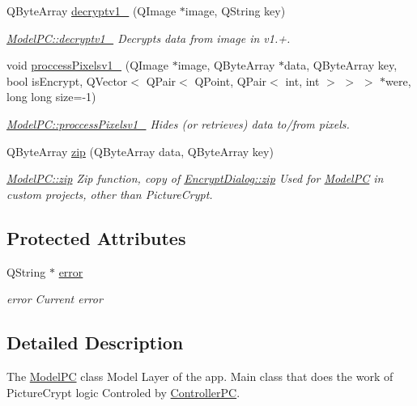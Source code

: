\begin{DoxyCompactItemize}
Q\+Byte\+Array \hyperlink{class_model_p_c_a7a1f7d491e1bde16936190b9e90896b0}{decryptv1\+\_} (Q\+Image $\ast$image, Q\+String key)
\begin{DoxyCompactList}\small\item\em \hyperlink{class_model_p_c_a7a1f7d491e1bde16936190b9e90896b0}{Model\+P\+C\+::decryptv1\+\_} Decrypts data from image in v1.+. \end{DoxyCompactList}\item 
void \hyperlink{class_model_p_c_a5cdb4d1d61ff62ee9d45b496a7dbf1fb}{proccess\+Pixelsv1\+\_} (Q\+Image $\ast$image, Q\+Byte\+Array $\ast$data, Q\+Byte\+Array key, bool is\+Encrypt, Q\+Vector$<$ Q\+Pair$<$ Q\+Point, Q\+Pair$<$ int, int $>$ $>$ $>$ $\ast$were, long long size=-\/1)
\begin{DoxyCompactList}\small\item\em \hyperlink{class_model_p_c_a5cdb4d1d61ff62ee9d45b496a7dbf1fb}{Model\+P\+C\+::proccess\+Pixelsv1\+\_} Hides (or retrieves) data to/from pixels. \end{DoxyCompactList}\item 
Q\+Byte\+Array \hyperlink{class_model_p_c_afebbbfa4b07deba4f68fc6dfb50f353f}{zip} (Q\+Byte\+Array data, Q\+Byte\+Array key)
\begin{DoxyCompactList}\small\item\em \hyperlink{class_model_p_c_afebbbfa4b07deba4f68fc6dfb50f353f}{Model\+P\+C\+::zip} Zip function, copy of \hyperlink{class_encrypt_dialog_a2bff820a3df4ddc36ecb07ed74b7138a}{Encrypt\+Dialog\+::zip} Used for \hyperlink{class_model_p_c}{Model\+PC} in custom projects, other than Picture\+Crypt. \end{DoxyCompactList}\end{DoxyCompactItemize}
\subsection*{Protected Attributes}
\begin{DoxyCompactItemize}
\item 
Q\+String $\ast$ \hyperlink{class_model_p_c_a4e5a9c0ca1f06fe5bc478b6bf248c37c}{error}
\begin{DoxyCompactList}\small\item\em error Current error \end{DoxyCompactList}\end{DoxyCompactItemize}


\subsection{Detailed Description}
The \hyperlink{class_model_p_c}{Model\+PC} class Model Layer of the app. Main class that does the work of Picture\+Crypt logic Controled by \hyperlink{class_controller_p_c}{Controller\+PC}. 

